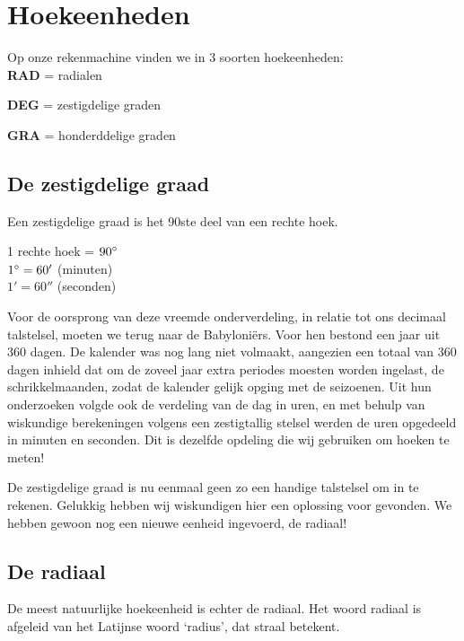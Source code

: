 \documentclass[a4paper,12pt]{article}
\begin{document}
\pagestyle{fancy}
\lhead{}

\onehalfspacing


\section{Hoekeenheden}
Op onze rekenmachine vinden we in  3 soorten hoekeenheden:\\

\textbf{RAD} = radialen

\textbf{DEG} = zestigdelige graden

\textbf{GRA} = honderddelige graden

\subsection{De zestigdelige graad}
Een zestigdelige graad is het 90ste deel van een rechte hoek.\\
\begin{center}
1 rechte hoek = $90^\circ$\\
$1^\circ = 60'$ (minuten)\\
$1' = 60''$ (seconden)\\
\end{center}
Voor de oorsprong van deze vreemde onderverdeling, in relatie tot ons decimaal talstelsel, moeten we terug naar de Babyloniërs. Voor hen bestond een jaar uit 360 dagen. De kalender was nog lang niet volmaakt, aangezien een totaal van 360 dagen inhield dat om de zoveel jaar extra periodes moesten worden ingelast, de schrikkelmaanden, zodat de kalender gelijk opging met de seizoenen. Uit hun onderzoeken volgde ook de verdeling van de dag in uren, en met behulp van wiskundige berekeningen volgens een zestigtallig stelsel werden de uren opgedeeld in minuten en seconden.
Dit is dezelfde opdeling die wij gebruiken om hoeken te meten!

De zestigdelige graad is nu eenmaal geen zo een handige talstelsel om in te rekenen. Gelukkig hebben wij wiskundigen hier een oplossing voor gevonden. We hebben gewoon nog een nieuwe eenheid ingevoerd, de radiaal!

\pagebreak
\subsection{De radiaal}
De meest natuurlijke hoekeenheid is echter de radiaal. Het woord radiaal is afgeleid van het Latijnse woord ‘radius’, dat straal betekent.
\end{document}
